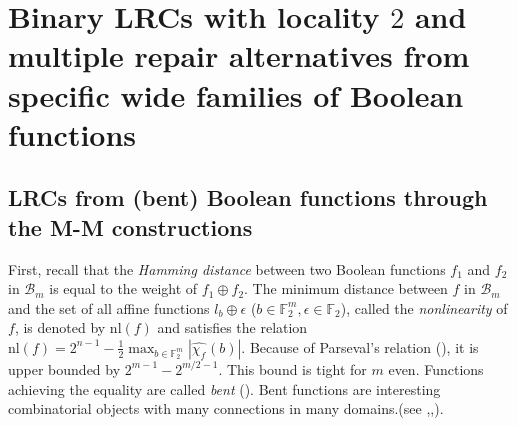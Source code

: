 \documentclass[10pt]{article}
\newcommand{\F}{\mathbb{F}}
\newcommand{\0}{\textbf{0}}
\newcommand{\1}{\textbf{1}}
\newcommand{\W}[2][]{\widehat{\chi_{#2}}^{#1}}
\begin{document}
\section{Binary LRCs with locality $2$  and multiple repair alternatives from specific wide families of  Boolean functions}\label{LRC-Bool-Specific}
\subsection{LRCs from (bent) Boolean functions through the M-M constructions}\label{LRC-MM}
First, recall that the {\it Hamming distance} between two Boolean functions $f_1$ and
$f_2$ in $\mathcal{B}_m$ is equal to the weight of $f_1\oplus f_2$.
The minimum distance between $f$ in $\mathcal{B}_m$ and the set of all affine
functions $l_{b}\oplus \epsilon$ ($b \in\F_2^m,\epsilon \in {\mathbb F}_2$), called the {\it nonlinearity} of $f$, is denoted by
$\mathrm{nl}(f)$ and satisfies the relation $\mathrm{nl}(f)=2^{n-1}-\frac{1}{2}\max_{b\in
\F_2^m}\left|\W f(b)\right|.$ Because of Parseval's relation (\cite{MS1977}), it is upper bounded by
$2^{m-1}-2^{m/2-1}$. This bound is tight for $m$ even. Functions achieving the equality are called \emph{bent} (\cite{Dil74,Rothaus}).
Bent functions are interesting combinatorial objects with many connections in many domains.(see \cite{CarletMesnagerDCC2015},\cite{Book-Carlet},\cite{SihemBentBook16}).



\end{document}
